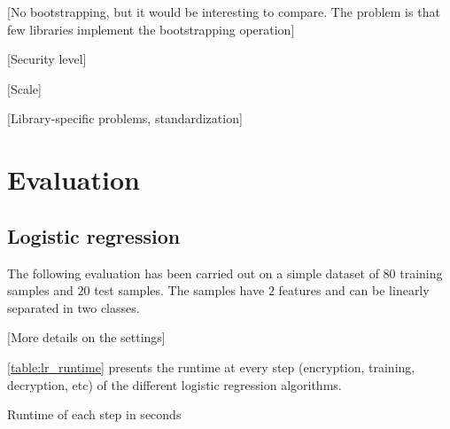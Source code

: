 \documentclass[a4paper,11pt,oneside]{report}
\begin{document}
[No bootstrapping, but it would be interesting to compare. The problem is that few libraries implement the bootstrapping operation]

[Security level]

[Scale]

[Library-specific problems, standardization]



\chapter{Evaluation}\label{chap:evaluation}


\section{Logistic regression}

The following evaluation has been carried out on a simple dataset of $80$ training samples and $20$ test samples. The samples have $2$ features and can be linearly separated in two classes.

[More details on the settings]

\autoref{table:lr_runtime} presents the runtime at every step (encryption, training, decryption, etc) of the different logistic regression algorithms.

\begin{table}[h!]
    \begin{center}
      \caption{Runtime of each step in seconds}
      \label{table:lr_runtime}
\end{center}
\end{table}
\end{document}

